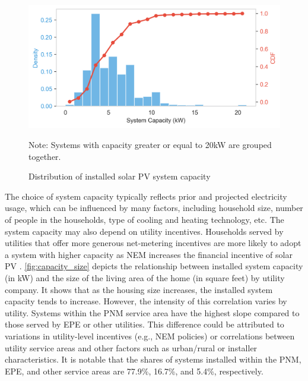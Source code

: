 \documentclass[11pt,twoside,letterpaper]{article}
\begin{document}
\begin{figure}[!ht]
    \centering
\includegraphics[width=1\textwidth]{figures/capacity_density_cdf.png}
    \caption{Distribution  of installed solar PV system capacity}
    \label{fig:capacity_density}
        \begin{flushleft}
        \footnotesize Note: Systems with capacity greater or equal to 20kW are grouped together. 
    \end{flushleft}
\end{figure}

The choice of system capacity typically reflects prior and projected electricity usage, which can be influenced by many factors, including household size, number of people in the households, type of cooling and heating technology, etc. The system capacity may also depend on utility incentives. Households served by utilities that offer more generous net-metering incentives are more likely to adopt a system with higher capacity as NEM increases the financial incentive of solar PV \parencite{borenstein_private_2017}. \autoref{fig:capacity_size} depicts the relationship between installed system capacity (in kW) and the size of the living area of the home (in square feet) by utility company. It shows that as the housing size increases, the installed system capacity tends to increase. However, the intensity of this correlation varies by utility. Systems within the PNM service area have the highest slope compared to those served by EPE or other utilities. This difference could be attributed to variations in utility-level incentives (e.g., NEM policies) or correlations between utility service areas and other factors such as urban/rural or installer characteristics. It is notable that the shares of systems installed within the PNM, EPE, and other service areas are 77.9\%, 16.7\%, and 5.4\%, respectively.
 
\end{document}
